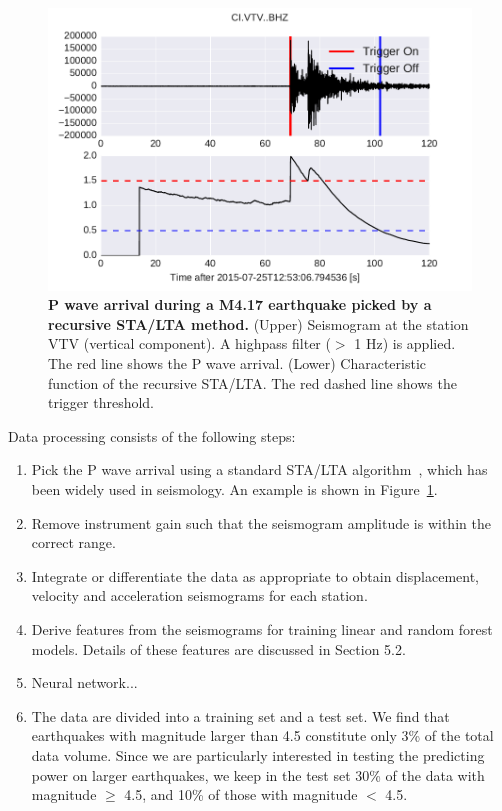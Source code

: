 \documentclass{article} %
\begin{document}
\begin{figure}[ht!]
	\centering
	\includegraphics*[scale=0.5, viewport= -55mm 0mm 500mm 100mm, angle=0]{./figure/sta_lta.pdf}
	\caption{{\bf P wave arrival during a M4.17 earthquake picked by a recursive STA/LTA method.} (Upper) Seismogram at the station VTV (vertical component). A highpass filter ($>$ 1 Hz) is applied. The red line shows the P wave arrival. (Lower) Characteristic function of the recursive STA/LTA. The red dashed line shows the trigger threshold.}\label{sta_lta} %
\end{figure}

Data processing consists of the following steps:

\begin{enumerate}
\item Pick the P wave arrival using a standard STA/LTA algorithm~\cite{Withers1998}, which has been widely used in seismology. An example is shown in Figure~\ref{sta_lta}. 
\item Remove instrument gain such that the seismogram amplitude is within the correct range.
\item Integrate or differentiate the data as appropriate to obtain displacement, velocity and acceleration seismograms for each station.
\item Derive features from the seismograms for training linear and random forest models. Details of these features are discussed in Section 5.2.   

\item Neural network...

\item The data are divided into a training set and a test set. We find that earthquakes with magnitude larger than 4.5 constitute only 3\% of the total data volume. Since we are particularly interested in testing the predicting power on larger earthquakes, we keep in the test set 30\% of the data with magnitude $\geq$ 4.5, and 10\% of those with magnitude $<$ 4.5.

\end{enumerate}
\end{document}
